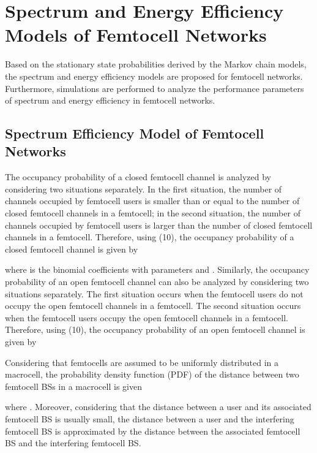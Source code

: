 \documentclass[10pt,final,journal,letterpaper,twoside,twocolumn]{IEEEtran}
\begin{document}
\section{Spectrum and Energy Efficiency Models of Femtocell Networks}
\label{sec4}

Based on the stationary state probabilities derived by the Markov chain models, the spectrum and energy efficiency models are proposed for femtocell networks. Furthermore, simulations are performed to analyze the performance parameters of spectrum and energy efficiency in femtocell networks.

\subsection{Spectrum Efficiency Model of Femtocell Networks}

The occupancy probability of a closed femtocell channel is analyzed by considering two situations separately. In the first situation, the number of channels occupied by femtocell users is smaller than or equal to the number of closed femtocell channels in a femtocell; in the second situation, the number of channels occupied by femtocell users is larger than the number of closed femtocell channels in a femtocell. Therefore, using (10), the occupancy probability of a closed femtocell channel is given by

where  is the binomial coefficients with parameters  and . Similarly, the occupancy probability of an open femtocell channel can also be analyzed by considering two situations separately. The first situation occurs when the femtocell
users do not occupy the open femtocell channels in a femtocell. The second situation occurs when the femtocell users occupy the open femtocell channels in a femtocell.
Therefore, using (10), the occupancy probability of an open femtocell channel is given by


Considering that femtocells are assumed to be uniformly distributed in a macrocell, the
probability density function (PDF) of the distance  between two femtocell
BSs in a macrocell is given \cite{Bettstetter02}

where . Moreover, considering that the distance between a user and its associated femtocell BS is usually small, the distance between a user and the interfering femtocell BS is approximated by the distance between the associated femtocell BS and the interfering femtocell BS.
\end{document}
